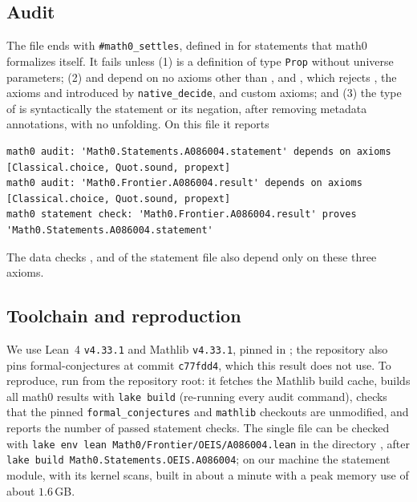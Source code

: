 \documentclass[11pt]{amsart}
\theoremstyle{plain}
\theoremstyle{definition}
\begin{document}
\subsection*{Audit}
The file ends with \texttt{\#math0\_settles}, defined in  for statements that math0 formalizes itself. It fails unless (1)  is a definition of type \texttt{Prop} without universe parameters; (2)  and  depend on no axioms other than ,  and , which rejects , the axioms  and  introduced by \texttt{native\_decide}, and custom axioms; and (3) the type of  is syntactically the statement or its negation, after removing metadata annotations, with no unfolding. On this file it reports
\begin{lstlisting}[basicstyle=\ttfamily\scriptsize]
math0 audit: 'Math0.Statements.A086004.statement' depends on axioms [Classical.choice, Quot.sound, propext]
math0 audit: 'Math0.Frontier.A086004.result' depends on axioms [Classical.choice, Quot.sound, propext]
math0 statement check: 'Math0.Frontier.A086004.result' proves 'Math0.Statements.A086004.statement'
\end{lstlisting}
The data checks ,  and  of the statement file also depend only on these three axioms.

\subsection*{Toolchain and reproduction}
We use Lean~4 \cite{Lean4} \texttt{v4.33.1} and Mathlib \cite{Mathlib} \texttt{v4.33.1}, pinned in ; the repository also pins formal-conjectures \cite{FC} at commit \texttt{c77fdd4}, which this result does not use. To reproduce, run  from the repository root: it fetches the Mathlib build cache, builds all math0 results with \texttt{lake build} (re-running every audit command), checks that the pinned \texttt{formal\_conjectures} and \texttt{mathlib} checkouts are unmodified, and reports the number of passed statement checks. The single file can be checked with \texttt{lake env lean Math0/Frontier/OEIS/A086004.lean} in the directory , after \texttt{lake build Math0.Statements.OEIS.A086004}; on our machine the statement module, with its kernel scans, built in about a minute with a peak memory use of about $1.6$\,GB.
\end{document}
